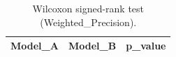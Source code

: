 \begin{table}[t]
\centering
\begin{tabular}{lll}
\toprule
Model_A & Model_B & p_value \\
\midrule
\bottomrule
\end{tabular}
\caption{Wilcoxon signed-rank test (Weighted_Precision).}
\label{tab:wilcoxon_Weighted_Precision}
\end{table}